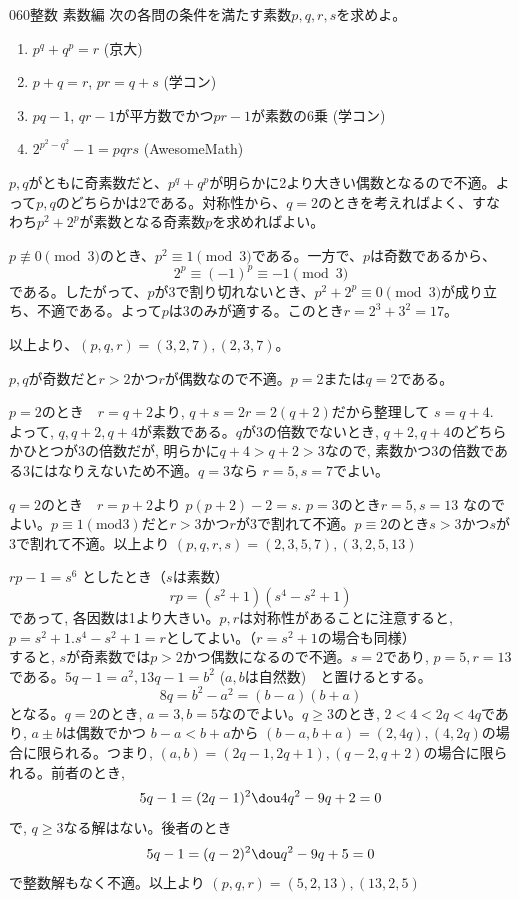 \begin{prob}{060}{}{整数 素数編}
 次の各問の条件を満たす素数$p, q, r, s$を求めよ。
 \begin{enumerate}
  \item $p^q+q^p=r$ (京大)
  \item $p+q=r$, $pr=q+s$ (学コン)
  \item $pq-1$, $qr-1$が平方数でかつ$pr-1$が素数の6乗 (学コン)
  \item $2^{p^2-q^2}-1=pqrs$ (AwesomeMath)
 \end{enumerate}
\end{prob}
$p, q$がともに奇素数だと、$p^q+q^p$が明らかに2より大きい偶数となるので不適。よって$p, q$のどちらかは2である。対称性から、$q=2$のときを考えればよく、すなわち$p^2+2^p$が素数となる奇素数$p$を求めればよい。

$p\not\equiv 0 \pmod{3}$のとき、$p^2\equiv 1 \pmod{3}$である。一方で、$p$は奇数であるから、
\[ 2^p \equiv (-1)^p \equiv -1 \pmod{3} \]
である。したがって、$p$が3で割り切れないとき、$p^2+2^p\equiv 0 \pmod{3}$が成り立ち、不適である。よって$p$は3のみが適する。このとき$r=2^3+3^2=17$。

以上より、$(p, q, r)=(3, 2, 7), (2, 3, 7)$。

$p,q$が奇数だと$r>2$かつ$r$が偶数なので不適。$p=2$または$q=2$である。

$p=2$のとき　$r=q+2$より, $q+s=2r=2(q+2)$だから整理して $s=q+4$.　よって, $q,q+2,q+4$が素数である。$q$が3の倍数でないとき, $q+2, q+4$のどちらかひとつが3の倍数だが, 明らかに$q+4>q+2>3$なので, 素数かつ3の倍数である3にはなりえないため不適。$q=3$なら $r=5, s=7$でよい。

$q=2$のとき　$r=p+2$より $p(p+2)-2=s$. $p=3$のとき$r=5, s=13$ なのでよい。$p\equiv 1 　(\mbox{mod} 3)$だと$r>3$かつ$r$が3で割れて不適。$p\equiv 2$のとき$s>3$かつ$s$が3で割れて不適。以上より $(p,q,r,s)=(2,3,5,7), (3,2,5,13)$

$rp-1=s^6$ としたとき（$s$は素数）
\[rp=(s^2+1)(s^4-s^2+1)\]
であって, 各因数は1より大きい。$p,r$は対称性があることに注意すると, $p=s^2+1. s^4-s^2+1=r$としてよい。（$r=s^2+1$の場合も同様）\\
すると, $s$が奇素数では$p>2$かつ偶数になるので不適。$s=2$であり, $p=5, r=13$である。$5q-1=a^2, 13q-1=b^2$ ($a,b$は自然数)　と置けるとする。
\[8q=b^2-a^2=(b-a)(b+a)\]
となる。$q=2$のとき, $a=3, b=5$なのでよい。$q\geq 3$のとき, $2<4<2q<4q$であり, $a\pm b$は偶数でかつ $b-a<b+a$から $(b-a,b+a)=(2, 4q), (4,2q)$の場合に限られる。つまり, $(a,b)=(2q-1, 2q+1), (q-2, q+2)$の場合に限られる。前者のとき,
\[5q-1=(2q-1)^2 \dou 4q^2-9q+2=0\]
で, $q\geq 3$なる解はない。後者のとき
\[5q-1=(q-2)^2 \dou q^2-9q+5=0\]
で整数解もなく不適。以上より $(p,q,r)=(5,2,13), (13,2,5)$

